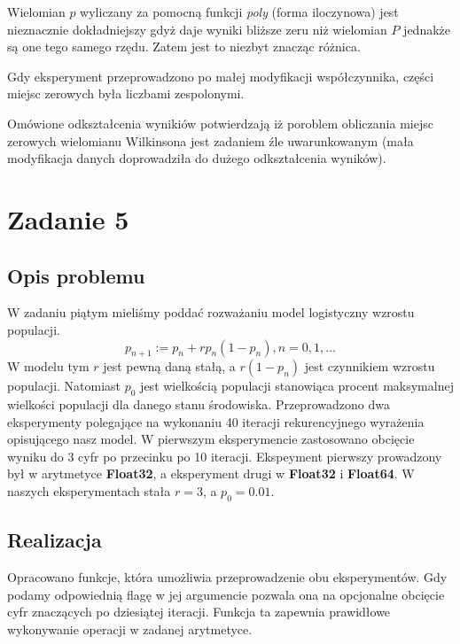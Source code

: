 \documentclass[]{article}
\begin{document}
Wielomian $p$ wyliczany za pomocną funkcji \textit{poly} (forma iloczynowa) jest nieznacznie dokładniejszy gdyż daje wyniki bliższe zeru niż wielomian $P$ jednakże są one tego samego rzędu. Zatem jest to niezbyt znacząc różnica.

Gdy eksperyment przeprowadzono po małej modyfikacji współczynnika, części miejsc zerowych była liczbami zespolonymi.

Omówione odkształcenia wynikiów potwierdzają iż poroblem obliczania miejsc zerowych wielomianu Wilkinsona jest zadaniem źle uwarunkowanym (mała modyfikacja danych doprowadziła do dużego odkształcenia wyników).  
\section{Zadanie 5}
\subsection{Opis problemu}
W zadaniu piątym mieliśmy poddać rozważaniu model logistyczny wzrostu populacji. \[p_{n+1} := p_n + rp_n(1-p_n), n = 0, 1, ...\] W modelu tym $r$ jest pewną daną stałą, a $r(1-p_n)$ jest czynnikiem wzrostu populacji. Natomiast $p_0$ jest wielkością populacji stanowiąca procent maksymalnej wielkości populacji dla danego stanu środowiska. Przeprowadzono dwa eksperymenty polegające na wykonaniu 40 iteracji rekurencyjnego wyrażenia opisującego nasz model. W pierwszym eksperymencie zastosowano obcięcie wyniku do 3 cyfr po przecinku po 10 iteracji. Ekspeyment pierwszy prowadzony był w arytmetyce \textbf{Float32}, a eksperyment drugi w \textbf{Float32} i \textbf{Float64}. W naszych eksperymentach stała $r = 3$, a $p_0 = 0.01$.  
\subsection{Realizacja}
Opracowano funkcje, która umożliwia przeprowadzenie obu eksperymentów. Gdy podamy odpowiednią flagę w jej argumencie pozwala ona na opcjonalne obcięcie cyfr znaczących po dziesiątej iteracji. Funkcja ta zapewnia prawidłowe wykonywanie operacji w zadanej arytmetyce.
\end{document}
